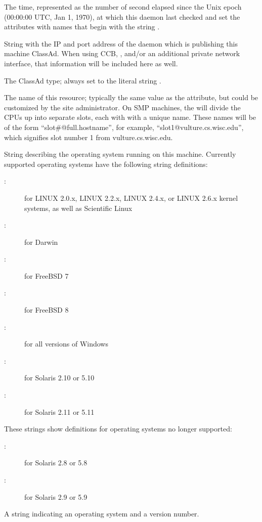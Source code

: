 \begin{description}
\item[\AdAttr{MonitorSelfTime}:] The  time, represented as the number of
  second elapsed since the Unix epoch (00:00:00 UTC, Jan 1, 1970),
  at which this daemon last checked and set the attributes with names that
  begin with the string .
  
\item[\AdAttr{MyAddress}:] String with the IP and port address of the
 daemon which is publishing this machine ClassAd.
When using CCB, , and/or an additional private
network interface, that information will be included here as well.

\item[\AdAttr{MyType}:] The ClassAd type; always set to the literal string .
%
\item[\AdAttr{Name}:] The name of this resource; typically the same value as
the  attribute, but could be customized by the site
administrator.
On SMP machines, the  will divide the CPUs up into separate
slots, each with with a unique name.
These names will be of the form ``slot\#@full.hostname'', for example,
``slot1@vulture.cs.wisc.edu'', which signifies slot number 1 from
vulture.cs.wisc.edu.
%
\label{OpSys-machine-attribute}
\item[\AdAttr{OpSys}:] String describing the operating system running on this
machine.  
Currently supported operating systems have the following string
definitions:
	\begin{description}
	\item[:] for LINUX 2.0.x, LINUX 2.2.x,
	LINUX 2.4.x, or LINUX 2.6.x kernel systems, as well as Scientific Linux 
	\item[:] for Darwin
	\item[:] for FreeBSD 7
	\item[:] for FreeBSD 8
	\item[:] for all versions of Windows
	\item[:] for Solaris 2.10 or 5.10
	\item[:] for Solaris 2.11 or 5.11
	\end{description}
These strings show definitions for operating systems no longer supported:
	\begin{description}
	\item[:] for Solaris 2.8 or 5.8
	\item[:] for Solaris 2.9 or 5.9
	\end{description}
%
\item[\AdAttr{OpSysAndVer}:] A string indicating an operating system and
a version number.


\end{description}
